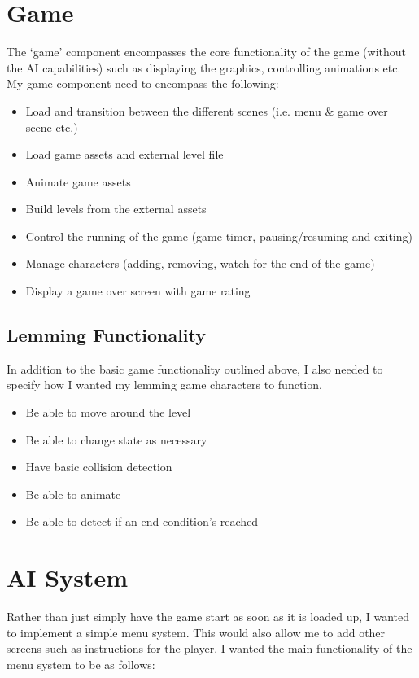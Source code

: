 \documentclass[a4paper,oneside]{report}
\begin{document}
\section{Game}

The `game' component encompasses the core functionality of the game (without the AI capabilities) such as displaying the graphics, controlling animations etc. My game component need to encompass the following:

\begin{itemize}
	\item Load and transition between the different scenes (i.e. menu \& game over scene etc.)
	\item Load game assets and external level file
	\item Animate game assets
	\item Build levels from the external assets
	\item Control the running of the game (game timer, pausing/resuming and exiting)
	\item Manage characters (adding, removing, watch for the end of the game)
	\item Display a game over screen with game rating
\end{itemize}

\subsection{Lemming Functionality}

In addition to the basic game functionality outlined above, I also needed to specify how I wanted my lemming game characters to function. 

\begin{itemize}
	\item Be able to move around the level
	\item Be able to change state as necessary
	\item Have basic collision detection
	\item Be able to animate
	\item Be able to detect if an end condition's reached
\end{itemize}

\section{AI System}

Rather than just simply have the game start as soon as it is loaded up, I wanted to implement a simple menu system. This would also allow me to add other screens such as instructions for the player. I wanted the main functionality of the menu system to be as follows:
\end{document}
